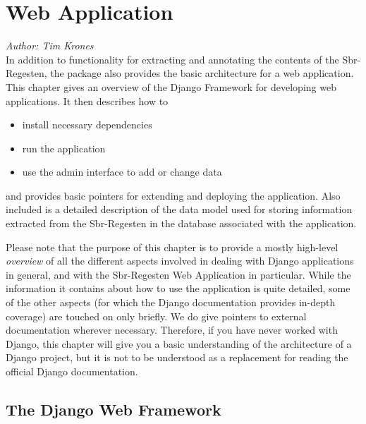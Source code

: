 \section{Web Application}

\emph{Author: Tim Krones} \\

In addition to functionality for extracting and annotating the
contents of the Sbr-Regesten, the package also provides the basic
architecture for a web application. This chapter gives an overview of
the Django Framework for developing web applications. It then describes
how to

\begin{itemize}
\item install necessary dependencies
\item run the application
\item use the admin interface to add or change data
\end{itemize}

and provides basic pointers for extending and deploying the
application. Also included is a detailed description of the data model
used for storing information extracted from the Sbr-Regesten in the
database associated with the application.

Please note that the purpose of this chapter is to provide a mostly
high-level \emph{overview} of all the different aspects involved in
dealing with Django applications in general, and with the Sbr-Regesten
Web Application in particular. While the information it contains about
how to use the application is quite detailed, some of the other
aspects (for which the Django documentation provides in-depth
coverage) are touched on only briefly. We do give pointers to external
documentation wherever necessary. Therefore, if you have never worked
with Django, this chapter will give you a basic understanding of the
architecture of a Django project, but it is not to be understood as a
replacement for reading the official Django documentation.

\subsection{The Django Web Framework}
\label{sec:django}

